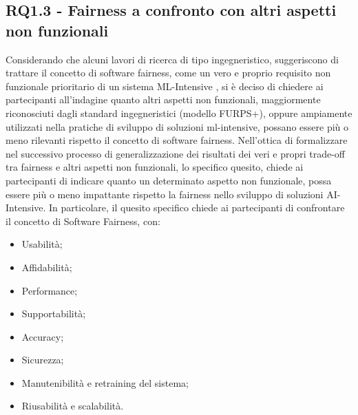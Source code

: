 	\subsection{RQ1.3 - Fairness a confronto con altri aspetti non funzionali}
	\begin{center}
		\hspace*{-5mm}%
	\end{center}
	
	Considerando che alcuni lavori di ricerca di tipo ingegneristico, suggeriscono di trattare il concetto di software fairness, come un vero e proprio requisito non funzionale prioritario di un sistema ML-Intensive \cite{brun2018software}, si è deciso di chiedere ai partecipanti all'indagine quanto altri aspetti non funzionali, maggiormente riconosciuti dagli standard ingegneristici (modello FURPS+), oppure ampiamente utilizzati nella pratiche di sviluppo di soluzioni ml-intensive, possano essere più o meno rilevanti rispetto il concetto di software fairness. Nell'ottica di formalizzare nel successivo processo di generalizzazione dei risultati dei veri e propri trade-off tra fairness e altri aspetti non funzionali, lo specifico quesito, chiede ai partecipanti di indicare quanto un determinato aspetto non funzionale, possa essere più o meno impattante rispetto la fairness nello sviluppo di soluzioni AI-Intensive. In particolare, il quesito specifico chiede ai partecipanti di confrontare il concetto di Software Fairness, con:
	
	\begin{itemize}
		\item Usabilità;
		\item Affidabilità;
		\item Performance;
		\item Supportabilità;
		\item Accuracy;
		\item Sicurezza;
		\item Manutenibilità e retraining del sistema;
		\item Riusabilità e scalabilità.
	\end{itemize}
	
